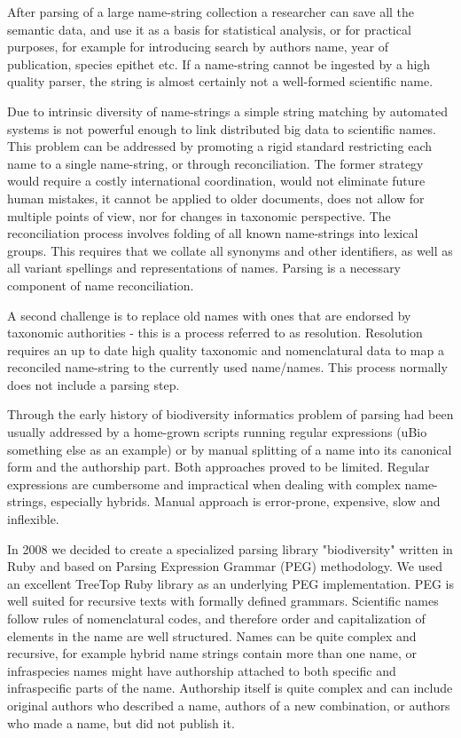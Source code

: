 \documentclass{bmcart}
\begin{document}
After parsing of a large name-string collection a researcher can save all
the semantic data, and use it as a basis for statistical analysis, or for
practical purposes, for example for introducing search by authors name, year of
publication, species epithet etc. If a name-string cannot be ingested by a high
quality parser, the string is almost certainly not a well-formed scientific
name.

Due to intrinsic diversity of name-strings a simple string matching by
automated systems is not powerful enough to link distributed big data to
scientific names. This problem can be addressed by promoting a rigid standard
restricting each name to a single name-string, or through reconciliation. The
former strategy would require a costly international coordination, would not
eliminate future human mistakes, it cannot be applied to older documents, does
not allow for multiple points of view, nor for changes in taxonomic
perspective.  The reconciliation process involves folding of all known
name-strings into lexical groups.  This requires that we collate all synonyms
and other identifiers, as well as all variant spellings and representations of
names. Parsing is a necessary component of name reconciliation.

A second challenge is to replace old names with ones that are endorsed by
taxonomic authorities - this is a process referred to as resolution. Resolution
requires an up to date high quality taxonomic and nomenclatural data to map a
reconciled name-string to the currently used name/names. This process normally
does not include a parsing step.

Through the early history of biodiversity informatics problem of parsing had
been usually addressed by a home-grown scripts running regular expressions
(uBio something else as an example) or by manual splitting of a name into its
canonical form and the authorship part. Both approaches proved to be limited.
Regular expressions are cumbersome and impractical when dealing with complex
name-strings, especially hybrids. Manual approach is error-prone, expensive,
slow and inflexible.

In 2008 we decided to create a specialized parsing library "biodiversity"
written in Ruby and based on Parsing Expression Grammar (PEG) methodology. We
used an excellent TreeTop Ruby library as an underlying PEG implementation. PEG
is well suited for recursive texts with formally defined grammars. Scientific
names follow rules of nomenclatural codes, and therefore order and
capitalization of elements in the name are well structured. Names can be quite
complex and recursive, for example hybrid name strings contain more than one
name, or infraspecies names might have authorship attached to both specific and
infraspecific parts of the name. Authorship itself is quite complex and can
include original authors who described a name, authors of a new combination, or
authors who made a name, but did not publish it.
\end{document}
